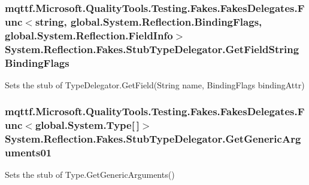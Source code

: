 \hypertarget{class_system_1_1_reflection_1_1_fakes_1_1_stub_type_delegator_a5c70625379665ddd924af16fcedc40ac}{
\subsubsection[{Get\-Field\-String\-Binding\-Flags}]{\setlength{\rightskip}{0pt plus 5cm}mqttf.\-Microsoft.\-Quality\-Tools.\-Testing.\-Fakes.\-Fakes\-Delegates.\-Func$<$string, global.\-System.\-Reflection.\-Binding\-Flags, global.\-System.\-Reflection.\-Field\-Info$>$ System.\-Reflection.\-Fakes.\-Stub\-Type\-Delegator.\-Get\-Field\-String\-Binding\-Flags}}\label{class_system_1_1_reflection_1_1_fakes_1_1_stub_type_delegator_a5c70625379665ddd924af16fcedc40ac}


Sets the stub of Type\-Delegator.\-Get\-Field(\-String name, Binding\-Flags binding\-Attr)

\hypertarget{class_system_1_1_reflection_1_1_fakes_1_1_stub_type_delegator_a94865b4b57444c2499604d1c3dacc7d3}{
\subsubsection[{Get\-Generic\-Arguments01}]{\setlength{\rightskip}{0pt plus 5cm}mqttf.\-Microsoft.\-Quality\-Tools.\-Testing.\-Fakes.\-Fakes\-Delegates.\-Func$<$global.\-System.\-Type\mbox{[}$\,$\mbox{]}$>$ System.\-Reflection.\-Fakes.\-Stub\-Type\-Delegator.\-Get\-Generic\-Arguments01}}\label{class_system_1_1_reflection_1_1_fakes_1_1_stub_type_delegator_a94865b4b57444c2499604d1c3dacc7d3}


Sets the stub of Type.\-Get\-Generic\-Arguments()

